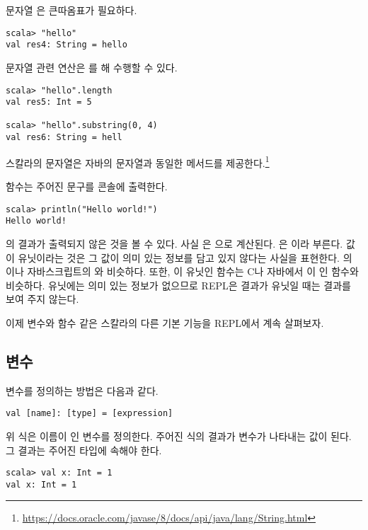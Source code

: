 문자열 은 큰따옴표가 필요하다.

\begin{verbatim}
scala> "hello"
val res4: String = hello
\end{verbatim}

문자열 관련 연산은 를 해 수행할 수 있다.

\begin{verbatim}
scala> "hello".length
val res5: Int = 5

scala> "hello".substring(0, 4)
val res6: String = hell
\end{verbatim}

스칼라의 문자열은 자바의 문자열과 동일한 메서드를 제공한다.\footnote{\url{https://docs.oracle.com/javase/8/docs/api/java/lang/String.html}}

 함수는 주어진 문구를 콘솔에 출력한다.

\begin{verbatim}
scala> println("Hello world!")
Hello world!
\end{verbatim}

의 결과가 출력되지 않은 것을 볼 수 있다. 사실
은 \code{()}으로
계산된다. \code{()}은 이라 부른다. 값이 유닛이라는 것은 그 값이 의미 있는
정보를 담고 있지 않다는 사실을 표현한다. 의 이나
자바스크립트의 와 비슷하다. 또한, 이 유닛인 함수는 C나 자바에서
이 인 함수와 비슷하다. 유닛에는 의미 있는 정보가 없으므로 REPL은
결과가 유닛일 때는 결과를 보여 주지 않는다.

이제 변수와 함수 같은 스칼라의 다른 기본 기능을 REPL에서 계속 살펴보자.

\subsection{변수}

변수를 정의하는 방법은 다음과 같다.

\begin{verbatim}
val [name]: [type] = [expression]
\end{verbatim}

위 식은 이름이 \code{[name]}인 변수를 정의한다. 주어진 식의 결과가 변수가 나타내는 값이
된다. 그 결과는 주어진 타입에 속해야 한다.

\begin{verbatim}
scala> val x: Int = 1
val x: Int = 1
\end{verbatim}


